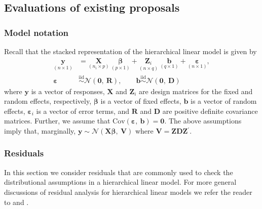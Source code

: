 \documentclass[12pt]{article} %
\newcommand{\trans}{\ensuremath{^\prime}}
\newcommand{\cov}{\ensuremath{\mathrm{Cov}}}
\begin{document}
\subsection{Evaluations of existing proposals}\label{supp:evals}

\subsubsection{Model notation}
Recall that the stacked representation of the hierarchical linear model is given by 
%
\begin{align}\label{eq:hlm}
	\underset{(n \times 1)}{\bm{y}} &= \underset{(n_i \times p)}{\bm{X}} \ \underset{(p \times 1)}{\bm{\beta}} + \underset{(n \times q)}{\bm{Z}_i} \ \underset{(q \times 1)}{\bm{b}} + \underset{(n \times 1)}{\bm{\varepsilon}},\\
	\bm{\varepsilon} & \overset{\text{iid}}{\sim} \mathcal{N}(\bm{0}, \ \bm{R}), \qquad \bm{b} \overset{\text{iid}}{\sim} \mathcal{N}(\bm{0},\ \bm{D}) \nonumber
\end{align}
%
where $\bm{y}$ is a vector of responses, $\bm{X}$ and $\bm{Z}_i$ are design matrices for the fixed and random effects, respectively, $\bm{\beta}$ is a vector of fixed effects, $\bm{b}$ is a vector of random effects, $\bm{\varepsilon}_i$ is a vector of error terms, and $\bm{R}$ and $\bm{D}$ are positive definite covariance matrices. Further, we assume that $\cov(\bm{\varepsilon},\ \bm{b}) = \bm{0}$. The above assumptions imply that, marginally, $\bm{y} \sim \mathcal{N}(\bm{X\beta},\ \bm{V})$ where $\bm{V} = \bm{ZDZ}\trans$.

\subsubsection{Residuals}

In this section we consider residuals that are commonly used to check the distributional assumptions in a hierarchical linear model. For more general discussions of residual analysis for hierarchical linear models we refer the reader to \cite{Haslett:2007vv} and \cite{Nobre:2007ej}.
\end{document}
